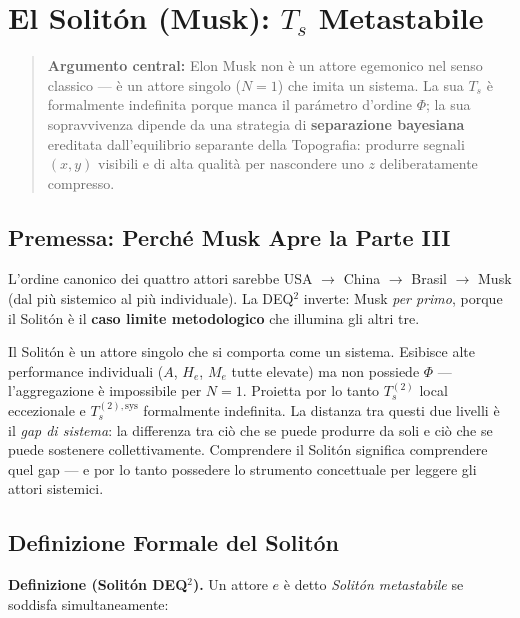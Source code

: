 \chapter{\texorpdfstring{El Solitón (Musk): \(T_s\)
Metastabile}{El Solitón (Musk): T\_s Metastabile}}\label{il-solitone-musk-t_s-metastabile}

\begin{quote}
\textbf{Argumento central:} Elon Musk non è un attore egemonico nel
senso classico --- è un attore singolo (\(N=1\)) che imita un sistema.
La sua \(T_s\) è formalmente indefinita porque manca il parámetro
d'ordine \(\Phi\); la sua sopravvivenza dipende da una strategia di
\textbf{separazione bayesiana} ereditata dall'equilibrio separante della
Topografia: produrre segnali \((x, y)\) visibili e di alta qualità per
nascondere uno \(z\) deliberatamente compresso.
\end{quote}



\section{Premessa: Perché Musk Apre la Parte
III}\label{premessa-perchuxe9-musk-apre-la-parte-iii}

L'ordine canonico dei quattro attori sarebbe USA $\to$ China $\to$ Brasil $\to$ Musk
(dal più sistemico al più individuale). La DEQ$^2$ inverte: Musk \emph{per
primo}, porque il Solitón è il \textbf{caso limite metodologico} che
illumina gli altri tre.

Il Solitón è un attore singolo che si comporta come un sistema.
Esibisce alte performance individuali (\(A\), \(H_e\), \(M_e\) tutte
elevate) ma non possiede \(\Phi\) --- l'aggregazione è impossibile per
\(N = 1\). Proietta por lo tanto \(T_s^{(2)}\) local eccezionale e
\(T_s^{(2),\text{sys}}\) formalmente indefinita. La distanza tra questi
due livelli è il \emph{gap di sistema}: la differenza tra ciò che se puede
produrre da soli e ciò che se puede sostenere collettivamente. Comprendere
il Solitón significa comprendere quel gap --- e por lo tanto possedere lo
strumento concettuale per leggere gli attori sistemici.



\section{Definizione Formale del
Solitón}\label{definición-formal-del-solitone}

\Hypoth{} \textbf{Definizione (Solitón DEQ$^2$).} Un attore \(e\) è detto
\emph{Solitón metastabile} se soddisfa simultaneamente:

